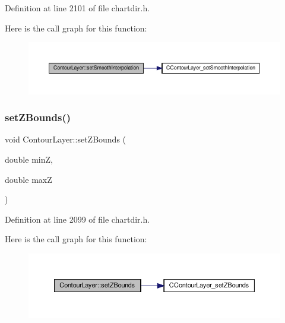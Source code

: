 Definition at line 2101 of file chartdir.\+h.

Here is the call graph for this function\+:
\nopagebreak
\begin{figure}[H]
\begin{center}
\leavevmode
\includegraphics[width=350pt]{class_contour_layer_a5670bc76e3eed0a1bb14e77caa5c497b_cgraph}
\end{center}
\end{figure}
\mbox{\label{class_contour_layer_ab83ec20fae511da1fc07f63f5fded683}} 
\subsubsection{\texorpdfstring{set\+Z\+Bounds()}{setZBounds()}}
{\footnotesize\ttfamily void Contour\+Layer\+::set\+Z\+Bounds (\begin{DoxyParamCaption}\item[{double}]{minZ,  }\item[{double}]{maxZ }\end{DoxyParamCaption})\hspace{0.3cm}{\ttfamily [inline]}}



Definition at line 2099 of file chartdir.\+h.

Here is the call graph for this function\+:
\nopagebreak
\begin{figure}[H]
\begin{center}
\leavevmode
\includegraphics[width=350pt]{class_contour_layer_ab83ec20fae511da1fc07f63f5fded683_cgraph}
\end{center}
\end{figure}
\mbox{\label{class_contour_layer_a8588a9186e0790c8981284879602ba2c}} 
